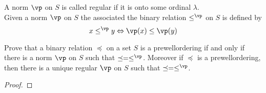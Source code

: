 \noindent
A norm $\vp$ on $S$ is called regular if it is onto some ordinal $\lambda$. \\ 
Given a norm $\vp$ on $S$ the associated the binary relation $\le^{\vp}$ on $S$ is defined by 
\[ x \le^{\vp} y \Leftrightarrow \vp(x) \le \vp(y) \]

\begin{exercise}
    Prove that a binary relation $\preceq$ on a set $S$ is a prewellordering if and only if there is a norm $\vp$ on $S$ such that $\preceq = \le^{\vp}$. Moreover if $\preceq$ is a prewellordering, then there is a unique regular $\vp$ on $S$ such that $\preceq = \le^{\vp}$.
\end{exercise}

\begin{proof}
    
\end{proof}